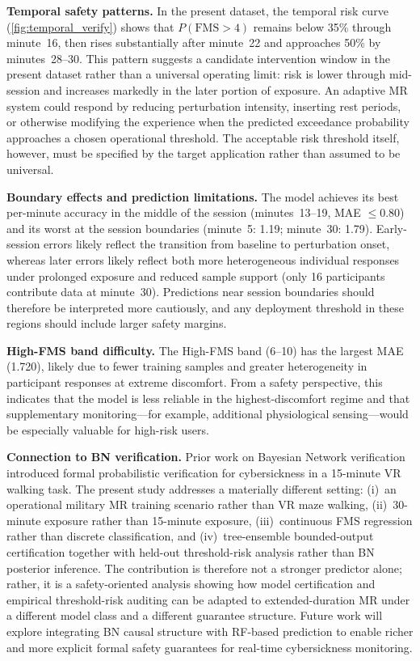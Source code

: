 \documentclass[review]{vgtc}              %
\begin{document}
\textbf{Temporal safety patterns.}
In the present dataset, the temporal risk curve (\cref{fig:temporal_verify}) shows that $P(\mathrm{FMS} > 4)$ remains below 35\% through minute~16, then rises substantially after minute~22 and approaches 50\% by minutes~28--30. This pattern suggests a candidate intervention window in the present dataset rather than a universal operating limit: risk is lower through mid-session and increases markedly in the later portion of exposure. An adaptive MR system could respond by reducing perturbation intensity, inserting rest periods, or otherwise modifying the experience when the predicted exceedance probability approaches a chosen operational threshold. The acceptable risk threshold itself, however, must be specified by the target application rather than assumed to be universal.

\textbf{Boundary effects and prediction limitations.}
The model achieves its best per-minute accuracy in the middle of the session (minutes~13--19, MAE $\leq 0.80$) and its worst at the session boundaries (minute~5: 1.19; minute~30: 1.79). Early-session errors likely reflect the transition from baseline to perturbation onset, whereas later errors likely reflect both more heterogeneous individual responses under prolonged exposure and reduced sample support (only 16 participants contribute data at minute~30). Predictions near session boundaries should therefore be interpreted more cautiously, and any deployment threshold in these regions should include larger safety margins.

\textbf{High-FMS band difficulty.}
The High-FMS band (6--10) has the largest MAE (1.720), likely due to fewer training samples and greater heterogeneity in participant responses at extreme discomfort. From a safety perspective, this indicates that the model is less reliable in the highest-discomfort regime and that supplementary monitoring---for example, additional physiological sensing---would be especially valuable for high-risk users.

\textbf{Connection to BN verification.}
Prior work on Bayesian Network verification~\cite{Wu2025BN} introduced formal probabilistic verification for cybersickness in a 15-minute VR walking task. The present study addresses a materially different setting: (i)~an operational military MR training scenario rather than VR maze walking, (ii)~30-minute exposure rather than 15-minute exposure, (iii)~continuous FMS regression rather than discrete classification, and (iv)~tree-ensemble bounded-output certification together with held-out threshold-risk analysis rather than BN posterior inference. The contribution is therefore not a stronger predictor alone; rather, it is a safety-oriented analysis showing how model certification and empirical threshold-risk auditing can be adapted to extended-duration MR under a different model class and a different guarantee structure. Future work will explore integrating BN causal structure with RF-based prediction to enable richer and more explicit formal safety guarantees for real-time cybersickness monitoring.
\end{document}
